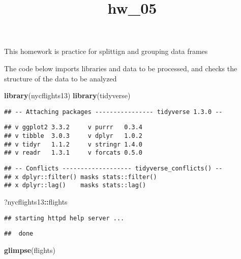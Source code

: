 \documentclass[
]{article}
\title{hw\_05}
\author{}
\date{\vspace{-2.5em}}
\newenvironment{Shaded}{\begin{snugshade}}{\end{snugshade}}
\newcommand{\KeywordTok}[1]{\textcolor[rgb]{0.13,0.29,0.53}{\textbf{#1}}}
\newcommand{\NormalTok}[1]{#1}
\newcommand{\OperatorTok}[1]{\textcolor[rgb]{0.81,0.36,0.00}{\textbf{#1}}}
\begin{document}
\maketitle

This homework is practice for splittign and grouping data frames

The code below imports libraries and data to be processed, and checks
the structure of the data to be analyzed

\begin{Shaded}
\begin{Highlighting}[]
\KeywordTok{library}\NormalTok{(nycflights13)}
\KeywordTok{library}\NormalTok{(tidyverse)}
\end{Highlighting}
\end{Shaded}

\begin{verbatim}
## -- Attaching packages ---------------- tidyverse 1.3.0 --
\end{verbatim}

\begin{verbatim}
## v ggplot2 3.3.2     v purrr   0.3.4
## v tibble  3.0.3     v dplyr   1.0.2
## v tidyr   1.1.2     v stringr 1.4.0
## v readr   1.3.1     v forcats 0.5.0
\end{verbatim}

\begin{verbatim}
## -- Conflicts ------------------- tidyverse_conflicts() --
## x dplyr::filter() masks stats::filter()
## x dplyr::lag()    masks stats::lag()
\end{verbatim}

\begin{Shaded}
\begin{Highlighting}[]
\NormalTok{?nycflights13}\OperatorTok{::}\NormalTok{flights}
\end{Highlighting}
\end{Shaded}

\begin{verbatim}
## starting httpd help server ...
\end{verbatim}

\begin{verbatim}
##  done
\end{verbatim}

\begin{Shaded}
\begin{Highlighting}[]
\KeywordTok{glimpse}\NormalTok{(flights)}
\end{Highlighting}
\end{Shaded}
\end{document}
